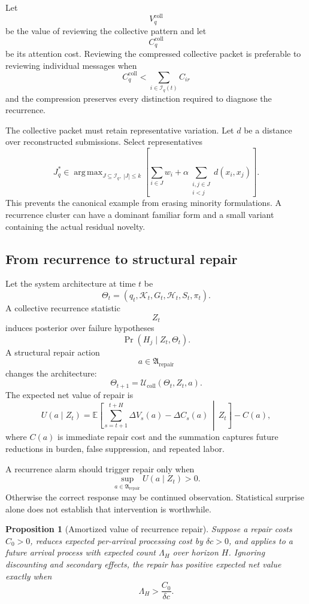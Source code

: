\documentclass[11pt]{article}
\newtheorem{proposition}[definition]{Proposition}
\theoremstyle{definition}
\DeclareMathOperator{\argmax}{arg\,max}
\DeclareMathOperator{\Prob}{Pr}
\newcommand{\E}{\mathbb{E}}
\newcommand{\K}{\mathcal{K}}
\newcommand{\given}{\,\middle|\,}
\begin{document}
Let
\[
V_q^{\mathrm{coll}}
\]
be the value of reviewing the collective pattern and let
\[
C_q^{\mathrm{coll}}
\]
be its attention cost. Reviewing the compressed collective packet is preferable to reviewing individual messages when
\[
C_q^{\mathrm{coll}}
<
\sum_{i\in\mathcal{I}_q(t)}C_{ir}
\]
and the compression preserves every distinction required to diagnose the recurrence.

The collective packet must retain representative variation. Let \(d\) be a distance over reconstructed submissions. Select representatives
\[
J_q^{*}
\in
\argmax_{
J\subseteq\mathcal{I}_q,\ |J|\leq k
}
\left[
\sum_{i\in J}w_i
+
\alpha
\sum_{\substack{i,j\in J\\i<j}}d(x_i,x_j)
\right].
\]
This prevents the canonical example from erasing minority formulations. A recurrence cluster can have a dominant familiar form and a small variant containing the actual residual novelty.

\subsection{From recurrence to structural repair}

Let the system architecture at time \(t\) be
\[
\Theta_t
=
\left(
q_t,
\K_t,
G_t,
\mathcal{H}_t,
S_t,
\pi_t
\right).
\]
A collective recurrence statistic
\[
Z_t
\]
induces posterior over failure hypotheses
\[
\Prob(H_j\mid Z_t,\Theta_t).
\]
A structural repair action
\[
a\in\mathfrak{A}_{\mathrm{repair}}
\]
changes the architecture:
\[
\Theta_{t+1}
=
\mathcal{U}_{\mathrm{coll}}(\Theta_t,Z_t,a).
\]
The expected net value of repair is
\[
U(a\mid Z_t)
=
\E\!\left[
\sum_{s=t+1}^{t+H}
\Delta V_s(a)
-
\Delta C_s(a)
\given
Z_t
\right]
-
C(a),
\]
where \(C(a)\) is immediate repair cost and the summation captures future reductions in burden, false suppression, and repeated labor.

A recurrence alarm should trigger repair only when
\[
\sup_{a\in\mathfrak{A}_{\mathrm{repair}}}
U(a\mid Z_t)>0.
\]
Otherwise the correct response may be continued observation. Statistical surprise alone does not establish that intervention is worthwhile.

\begin{proposition}[Amortized value of recurrence repair]
Suppose a repair costs \(C_0>0\), reduces expected per-arrival processing cost by \(\delta c>0\), and applies to a future arrival process with expected count \(\Lambda_H\) over horizon \(H\). Ignoring discounting and secondary effects, the repair has positive expected net value exactly when
\[
\Lambda_H>\frac{C_0}{\delta c}.
\]
\end{proposition}
\end{document}
